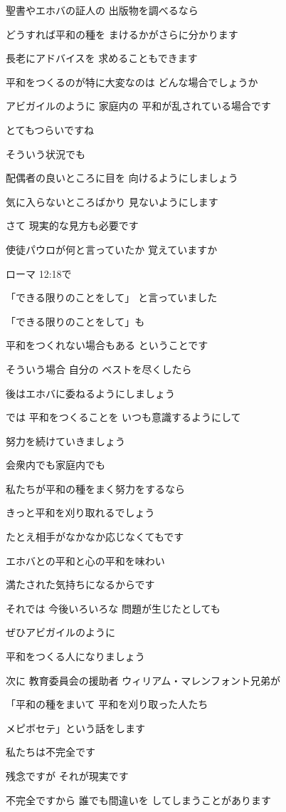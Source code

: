 \documentclass[twocolumn]{jsarticle}
\begin{document}
聖書やエホバの証人の
出版物を調べるなら 

どうすれば平和の種を
まけるかがさらに分かります

長老にアドバイスを
求めることもできます

平和をつくるのが特に大変なのは
どんな場合でしょうか

アビガイルのように 家庭内の
平和が乱されている場合です

とてもつらいですね

そういう状況でも

配偶者の良いところに目を
向けるようにしましょう

気に入らないところばかり
見ないようにします

さて 現実的な見方も必要です

使徒パウロが何と言っていたか
覚えていますか

ローマ 12:18で

「できる限りのことをして」
と言っていました

「できる限りのことをして」も

平和をつくれない場合もある
ということです

そういう場合 自分の
ベストを尽くしたら

後はエホバに委ねるようにしましょう

では 平和をつくることを
いつも意識するようにして

努力を続けていきましょう

会衆内でも家庭内でも

私たちが平和の種をまく努力をするなら

きっと平和を刈り取れるでしょう

たとえ相手がなかなか応じなくてもです

エホバとの平和と心の平和を味わい

満たされた気持ちになるからです

それでは 今後いろいろな
問題が生じたとしても

ぜひアビガイルのように

平和をつくる人になりましょう

次に 教育委員会の援助者
ウィリアム・マレンフォント兄弟が

「平和の種をまいて
平和を刈り取った人たち

メピボセテ」という話をします

私たちは不完全です

残念ですが それが現実です

不完全ですから 誰でも間違いを
してしまうことがあります
\end{document}

